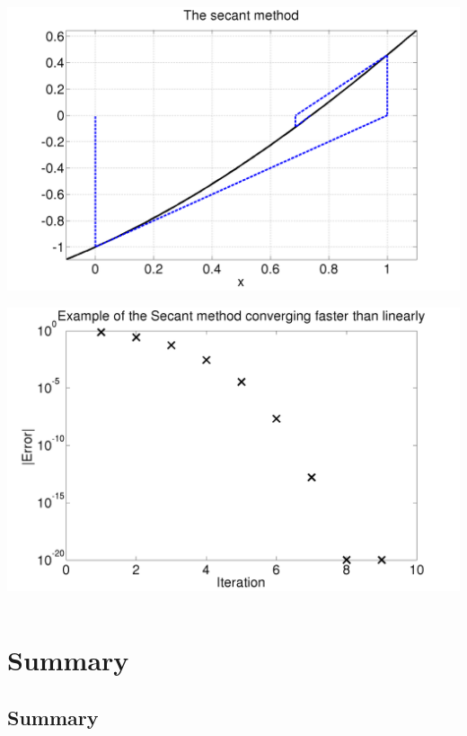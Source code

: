\documentclass{beamer}
\begin{document}
\begin{frame}
\begin{columns}
\begin{column}{0.5\textwidth}
\begin{overlayarea}{\textwidth}{0.9\textwidth}
{\begin{center}
            \includegraphics[width=\textwidth]{figures/SecantMap4}
          \end{center}
        }
        {
          \begin{center}
            \includegraphics[width=\textwidth]{figures/Secant1}
          \end{center}
        }
      \end{overlayarea}
    \end{column}
  \end{columns}
\end{frame}


\section{Summary}


\subsection{Summary}
\end{document}

